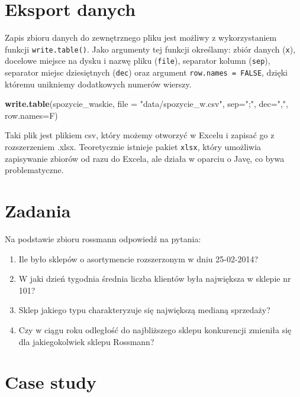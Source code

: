 \documentclass[]{book}
\newenvironment{Shaded}{\begin{snugshade}}{\end{snugshade}}
\newcommand{\KeywordTok}[1]{\textcolor[rgb]{0.13,0.29,0.53}{\textbf{#1}}}
\newcommand{\DataTypeTok}[1]{\textcolor[rgb]{0.13,0.29,0.53}{#1}}
\newcommand{\StringTok}[1]{\textcolor[rgb]{0.31,0.60,0.02}{#1}}
\newcommand{\NormalTok}[1]{#1}
\providecommand{\tightlist}{%
  \setlength{\itemsep}{0pt}\setlength{\parskip}{0pt}}
\begin{document}
\section{Eksport danych}\label{eksport-danych}

Zapis zbioru danych do zewnętrznego pliku jest możliwy z wykorzystaniem
funkcji \texttt{write.table()}. Jako argumenty tej funkcji określamy:
zbiór danych (\texttt{x}), docelowe miejsce na dysku i nazwę pliku
(\texttt{file}), separator kolumn (\texttt{sep}), separator miejsc
dziesiętnych (\texttt{dec}) oraz argument \texttt{row.names\ =\ FALSE},
dzięki któremu unikniemy dodatkowych numerów wierszy.

\begin{Shaded}
\begin{Highlighting}[]
\KeywordTok{write.table}\NormalTok{(spozycie_waskie, }\DataTypeTok{file =} \StringTok{"data/spozycie_w.csv"}\NormalTok{, }\DataTypeTok{sep=}\StringTok{";"}\NormalTok{, }\DataTypeTok{dec=}\StringTok{","}\NormalTok{, }\DataTypeTok{row.names=}\NormalTok{F)}
\end{Highlighting}
\end{Shaded}

Taki plik jest plikiem csv, który możemy otworzyć w Excelu i zapisać go
z rozszerzeniem .xlsx. Teoretycznie istnieje pakiet \texttt{xlsx}, który
umożliwia zapisywanie zbiorów od razu do Excela, ale działa w oparciu o
Javę, co bywa problematyczne.

\section{Zadania}\label{zadania-2}

Na podstawie zbioru rossmann odpowiedź na pytania:

\begin{enumerate}
\def\labelenumi{\arabic{enumi}.}
\tightlist
\item
  Ile było sklepów o asortymencie rozszerzonym w dniu 25-02-2014?
\item
  W jaki dzień tygodnia średnia liczba klientów była największa w
  sklepie nr 101?
\item
  Sklep jakiego typu charakteryzuje się największą medianą sprzedaży?
\item
  Czy w ciągu roku odległość do najbliższego sklepu konkurencji zmieniła
  się dla jakiegokolwiek sklepu Rossmann?
\end{enumerate}

\section{Case study}\label{case-study}
\end{document}
